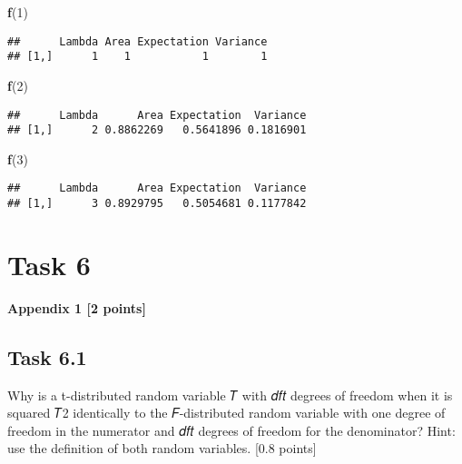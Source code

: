 \documentclass[
]{article}
\newenvironment{Shaded}{\begin{snugshade}}{\end{snugshade}}
\newcommand{\DecValTok}[1]{\textcolor[rgb]{0.00,0.00,0.81}{#1}}
\newcommand{\KeywordTok}[1]{\textcolor[rgb]{0.13,0.29,0.53}{\textbf{#1}}}
\newcommand{\NormalTok}[1]{#1}
\begin{document}
\begin{Shaded}
\begin{Highlighting}[]
\KeywordTok{f}\NormalTok{(}\DecValTok{1}\NormalTok{)}
\end{Highlighting}
\end{Shaded}

\begin{verbatim}
##      Lambda Area Expectation Variance
## [1,]      1    1           1        1
\end{verbatim}

\begin{Shaded}
\begin{Highlighting}[]
\KeywordTok{f}\NormalTok{(}\DecValTok{2}\NormalTok{)}
\end{Highlighting}
\end{Shaded}

\begin{verbatim}
##      Lambda      Area Expectation  Variance
## [1,]      2 0.8862269   0.5641896 0.1816901
\end{verbatim}

\begin{Shaded}
\begin{Highlighting}[]
\KeywordTok{f}\NormalTok{(}\DecValTok{3}\NormalTok{)}
\end{Highlighting}
\end{Shaded}

\begin{verbatim}
##      Lambda      Area Expectation  Variance
## [1,]      3 0.8929795   0.5054681 0.1177842
\end{verbatim}

\hypertarget{task-6}{%
\section{Task 6}\label{task-6}}

\textbf{Appendix 1 {[}2 points{]}}

\hypertarget{task-6.1}{%
\subsection{Task 6.1}\label{task-6.1}}

Why is a t-distributed random variable 𝑇 with 𝑑𝑓𝑡 degrees of freedom
when it is squared 𝑇2 identically to the 𝐹-distributed random variable
with one degree of freedom in the numerator and 𝑑𝑓𝑡 degrees of freedom
for the denominator? Hint: use the definition of both random variables.
{[}0.8 points{]}
\end{document}
